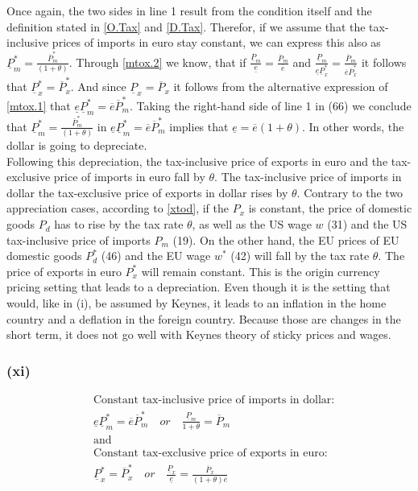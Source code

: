 Once again, the two sides in line 1 result from the condition itself and the definition stated in \eqref{O.Tax} and \eqref{D.Tax}. Therefor, if we assume that the tax-inclusive prices of imports in euro stay constant, we can express this also as $\underline P^*_m  = \frac{\overline P^*_m}{(1+\theta)}$. Through \eqref{mtox.2} we know, that if $\frac{\underline P_m}{\underline e} = \frac{\overline P_m}{\overline e}$ and $\frac{\underline P_m}{\underline e \underline P_x^*} = \frac{\overline P_m}{\overline e \overline P_x^*}$ it follows that $\underline P^*_x = \overline P^*_x$. And since $\underline P_x = \overline P_x$ it follows from the alternative expression of \eqref{mtox.1} that $\underline e \underline P^*_m = \overline e \overline P_m^*$. Taking the right-hand side of line 1 in (66) we conclude that $\underline P^*_m  = \frac{\overline P^*_m}{(1+\theta)}$ in $\underline e \underline P^*_m = \overline e \overline P_m^*$ implies that $\underline e = \overline e (1+\theta)$. In other words, the dollar is going to depreciate. \\
Following this depreciation, the tax-inclusive price of exports in euro and the tax-exclusive price of imports in euro fall by $\theta$. The tax-inclusive price of imports in dollar the tax-exclusive price of exports in dollar rises by $\theta$.
Contrary to the two appreciation cases, according to \eqref{xtod}, if the $P_x$ is constant, the price of domestic goods $P_d$ has to rise by the tax rate $\theta$, as well as the US wage $w$ (31) and the US tax-inclusive price of imports $P_m$ (19). On the other hand, the EU prices of EU domestic goods $P^*_d$ (46) and the EU wage $w^*$ (42) will fall by the tax rate $\theta$. The price of exports in euro $P^*_x$ will remain constant. 
This is the origin currency pricing setting that leads to a depreciation. Even though it is the setting that would, like in (i), be assumed by Keynes, it leads to an inflation in the home country and a deflation in the foreign country. Because those are changes in the short term, it does not go well with Keynes theory of sticky prices and wages. 

\subsubsection*{(xi)}
\begin{equation}\label{xi}
\begin{aligned}
&\text{Constant tax-inclusive price of imports in dollar:}\\ &\underline e \underline P^*_m = \overline e \overline P^*_m \quad or \quad \frac{\underline P_m}{1+\theta} = \overline P_m \\
&\text{and}\\
&\text{Constant tax-exclusive price of exports in euro:}\\ &\underline P^*_x = \overline P^*_x \quad or \quad \frac{\underline P_x}{\underline e} = \frac{\overline P_x}{(1+\theta)\overline e}
\end{aligned}
\end{equation}

